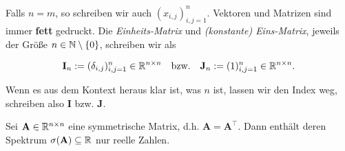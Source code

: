             Falls $n = m$, so schreiben wir auch $(x_{i, j})_{i, j = 1}^n$.
            Vektoren und Matrizen sind immer \textbf{fett} gedruckt.
            Die \textit{Einheits-Matrix} und \textit{(konstante) Eins-Matrix}, jeweils der Größe $n \in \mathbb N \setminus {\left \{ 0 \right \}}$, schreiben wir als

            \begin{align*}
                \mathbf I_n := (\delta_{i, j})_{i, j = 1}^n \in \mathbb R^{n \times n}
                \quad
                \text{bzw.}
                \quad
                \mathbf J_n := (1)_{i, j = 1}^n \in \mathbb R^{n \times n}.
            \end{align*}

            Wenn es aus dem Kontext heraus klar ist, was $n$ ist, lassen wir den Index weg, schreiben also $\mathbf I$ bzw. $\mathbf J$.

            \begin{lemma}

                Sei $\mathbf A \in \mathbb R^{n \times n}$ eine symmetrische Matrix, d.h. $\mathbf A = \mathbf A^\top$.
                Dann enthält deren Spektrum $\sigma(\mathbf A) \subseteq \mathbb R$ nur reelle Zahlen.

            \end{lemma}

